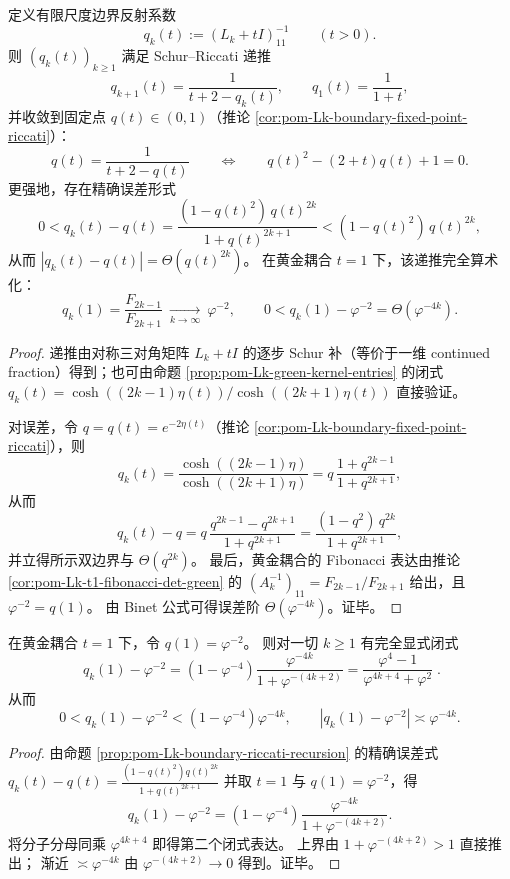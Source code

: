 \begin{proposition}\label{prop:pom-Lk-boundary-riccati-recursion}
定义有限尺度边界反射系数
\[
q_k(t):=(L_k+tI)^{-1}_{11}\qquad(t>0).
\]
则 \((q_k(t))_{k\ge 1}\) 满足 Schur--Riccati 递推
\[
q_{k+1}(t)=\frac{1}{t+2-q_k(t)},\qquad q_1(t)=\frac{1}{1+t},
\]
并收敛到固定点 \(q(t)\in(0,1)\)（推论 \ref{cor:pom-Lk-boundary-fixed-point-riccati}）：
\[
q(t)=\frac{1}{t+2-q(t)}\qquad\Longleftrightarrow\qquad q(t)^2-(2+t)q(t)+1=0.
\]
更强地，存在精确误差形式
\[
0<q_k(t)-q(t)=\frac{(1-q(t)^2)\,q(t)^{2k}}{1+q(t)^{2k+1}}
< (1-q(t)^2)\,q(t)^{2k},
\]
从而 \(|q_k(t)-q(t)|=\Theta(q(t)^{2k})\)。
在黄金耦合 \(t=1\) 下，该递推完全算术化：
\[
q_k(1)=\frac{F_{2k-1}}{F_{2k+1}}\ \xrightarrow[k\to\infty]{}\ \varphi^{-2},
\qquad
0<q_k(1)-\varphi^{-2}=\Theta(\varphi^{-4k}).
\]
\end{proposition}
\begin{proof}
递推由对称三对角矩阵 \(L_k+tI\) 的逐步 Schur 补（等价于一维 continued fraction）得到；也可由命题 \ref{prop:pom-Lk-green-kernel-entries} 的闭式 \(q_k(t)=\cosh((2k-1)\eta(t))/\cosh((2k+1)\eta(t))\) 直接验证。

对误差，令 \(q=q(t)=e^{-2\eta(t)}\)（推论 \ref{cor:pom-Lk-boundary-fixed-point-riccati}），则
\[
q_k(t)=\frac{\cosh((2k-1)\eta)}{\cosh((2k+1)\eta)}
=q\,\frac{1+q^{2k-1}}{1+q^{2k+1}},
\]
从而
\[
q_k(t)-q=q\,\frac{q^{2k-1}-q^{2k+1}}{1+q^{2k+1}}
=\frac{(1-q^2)\,q^{2k}}{1+q^{2k+1}},
\]
并立得所示双边界与 \(\Theta(q^{2k})\)。
最后，黄金耦合的 Fibonacci 表达由推论 \ref{cor:pom-Lk-t1-fibonacci-det-green} 的 \((A_k^{-1})_{11}=F_{2k-1}/F_{2k+1}\) 给出，且 \(\varphi^{-2}=q(1)\)。
由 Binet 公式可得误差阶 \(\Theta(\varphi^{-4k})\)。证毕。
\end{proof}

\begin{corollary}[黄金耦合 \texorpdfstring{$t=1$}{t=1} 的边界反射误差闭式]\label{cor:pom-Lk-t1-error-closed-form}
在黄金耦合 \(t=1\) 下，令 \(q(1)=\varphi^{-2}\)。
则对一切 \(k\ge 1\) 有完全显式闭式
\begin{equation}\label{eq:pom-Lk-t1-error-closed-form}
\boxed{\;
q_k(1)-\varphi^{-2}
=(1-\varphi^{-4})\frac{\varphi^{-4k}}{1+\varphi^{-(4k+2)}}
=\frac{\varphi^4-1}{\varphi^{4k+4}+\varphi^{2}}\; }.
\end{equation}
从而
\[
0<q_k(1)-\varphi^{-2}<(1-\varphi^{-4})\varphi^{-4k},
\qquad
|q_k(1)-\varphi^{-2}|\asymp \varphi^{-4k}.
\]
\end{corollary}
\begin{proof}
由命题 \ref{prop:pom-Lk-boundary-riccati-recursion} 的精确误差式
\(
q_k(t)-q(t)=\frac{(1-q(t)^2)q(t)^{2k}}{1+q(t)^{2k+1}}
\)
并取 \(t=1\) 与 \(q(1)=\varphi^{-2}\)，得
\[
q_k(1)-\varphi^{-2}
=(1-\varphi^{-4})\frac{\varphi^{-4k}}{1+\varphi^{-(4k+2)}}.
\]
将分子分母同乘 \(\varphi^{4k+4}\) 即得第二个闭式表达。
上界由 \(1+\varphi^{-(4k+2)}>1\) 直接推出；
渐近 \(\asymp\varphi^{-4k}\) 由 \(\varphi^{-(4k+2)}\to 0\) 得到。证毕。
\end{proof}

